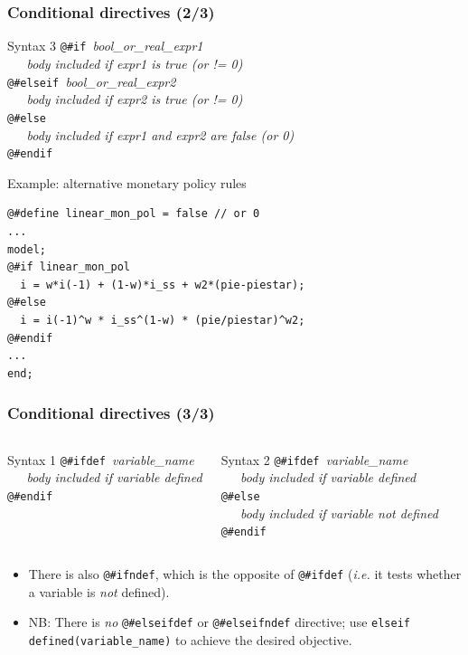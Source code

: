 \documentclass[aspectratio=169]{beamer}
\begin{document}
\begin{frame}[fragile=singleslide]
  \frametitle{Conditional directives (2/3)}
  \begin{block}{Syntax 3}
     \scriptsize
   \verb+@#if +\textit{bool\_or\_real\_expr1} \\
    \verb+   +\textit{body included if expr1 is true (or != 0)} \\
    \verb+@#elseif +\textit{bool\_or\_real\_expr2} \\
    \verb+   +\textit{body included if expr2 is true (or != 0)} \\
    \verb+@#else+ \\
    \verb+   +\textit{body included if expr1 and expr2 are false (or 0)} \\
    \verb+@#endif+
  \end{block}

  \begin{block}{Example: alternative monetary policy rules}
    \scriptsize
\begin{verbatim}
@#define linear_mon_pol = false // or 0
...
model;
@#if linear_mon_pol
  i = w*i(-1) + (1-w)*i_ss + w2*(pie-piestar);
@#else
  i = i(-1)^w * i_ss^(1-w) * (pie/piestar)^w2;
@#endif
...
end;
\end{verbatim}
    \scriptsize
  \end{block}
\end{frame}

\begin{frame}[fragile=singleslide]
  \frametitle{Conditional directives (3/3)}

  \begin{columns}[T]
    \begin{block}{Syntax 1}
\verb+@#ifdef +\textit{variable\_name} \\
\verb+   +\textit{body included if variable defined} \\
\verb+@#endif+
    \end{block}

    \begin{block}{Syntax 2}
\verb+@#ifdef +\textit{variable\_name} \\
\verb+   +\textit{body included if variable defined} \\
\verb+@#else+ \\
\verb+   +\textit{body included if variable not defined} \\
\verb+@#endif+
    \end{block}
  \end{columns}

\bigskip
\begin{itemize}
\item There is also \verb+@#ifndef+, which is the opposite of \verb+@#ifdef+
(\textit{i.e.} it tests whether a variable is \emph{not} defined).
\item NB: There is
\emph{no} \verb+@#elseifdef+ or \verb+@#elseifndef+ directive; use
\verb+elseif defined(variable_name)+ to achieve the desired objective.
\end{itemize}
\end{frame}
\end{document}
